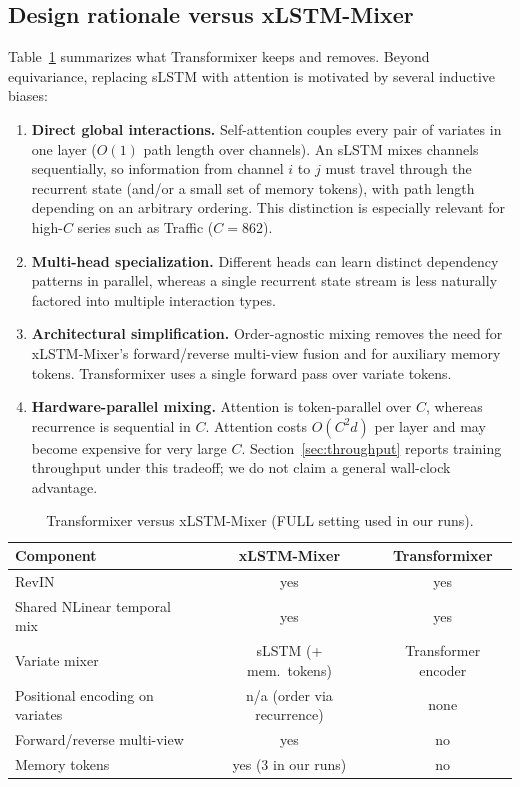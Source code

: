 \documentclass{article}
\begin{document}
\subsection{Design rationale versus xLSTM-Mixer}
\label{sec:rationale}
Table~\ref{tab:diff} summarizes what Transformixer keeps and removes.
Beyond equivariance, replacing sLSTM with attention is motivated by several inductive biases:

\begin{enumerate}
  \item \textbf{Direct global interactions.}
  Self-attention couples every pair of variates in one layer ($O(1)$ path length over channels).
  An sLSTM mixes channels sequentially, so information from channel $i$ to $j$ must travel through the recurrent state (and/or a small set of memory tokens), with path length depending on an arbitrary ordering.
  This distinction is especially relevant for high-$C$ series such as Traffic ($C{=}862$).

  \item \textbf{Multi-head specialization.}
  Different heads can learn distinct dependency patterns in parallel, whereas a single recurrent state stream is less naturally factored into multiple interaction types.

  \item \textbf{Architectural simplification.}
  Order-agnostic mixing removes the need for xLSTM-Mixer's forward/reverse multi-view fusion and for auxiliary memory tokens.
  Transformixer uses a single forward pass over variate tokens.

  \item \textbf{Hardware-parallel mixing.}
  Attention is token-parallel over $C$, whereas recurrence is sequential in $C$.
  Attention costs $O(C^2 d)$ per layer and may become expensive for very large $C$.
  Section~\ref{sec:throughput} reports training throughput under this tradeoff; we do not claim a general wall-clock advantage.
\end{enumerate}

\begin{table}[t]
  \centering
  \caption{Transformixer versus xLSTM-Mixer (FULL setting used in our runs).}
  \label{tab:diff}
  \begin{tabular}{lcc}
    \toprule
    Component & xLSTM-Mixer & Transformixer \\
    \midrule
    RevIN & yes & yes \\
    Shared NLinear temporal mix & yes & yes \\
    Variate mixer & sLSTM (+ mem.\ tokens) & Transformer encoder \\
    Positional encoding on variates & n/a (order via recurrence) & none \\
    Forward/reverse multi-view & yes & no \\
    Memory tokens & yes (3 in our runs) & no \\
    \bottomrule
  \end{tabular}
\end{table}
\end{document}
